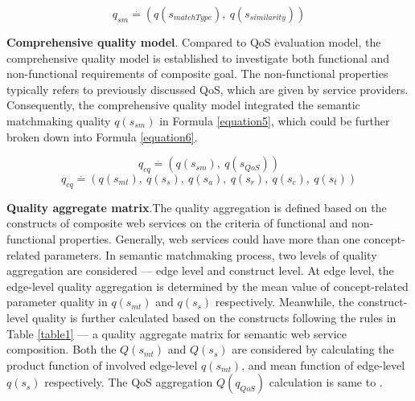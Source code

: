 \documentclass{llncs}
\begin{document}
\begin{equation}
\label{equation4}
q_{sm} \stackrel{.}{=} (q(s_ {matchType}), \  q(s_ {similarity}))
\end{equation}

\textbf{Comprehensive quality model}. Compared to QoS evaluation model, the comprehensive quality model is established to investigate both functional and non-functional requirements of composite goal. The non-functional properties typically refers to previously discussed QoS, which are given by service providers. Consequently, the comprehensive quality model integrated the semantic matchmaking quality $q(s_{sm})$ in Formula \ref{equation5}, which could be further broken down into Formula \ref{equation6}.

\begin{equation}
\label{equation5}
q_{cq} \stackrel{.}{=} (q(s_ {sm}), \  q(s_ {QoS}))
\end{equation}
\begin{equation}
\label{equation6}
q_{cq} \stackrel{.}{=} (q(s_ {mt}), \  q(s_ {s}), \  q(s_{a}),\  q(s_{r}),\  q(s_{c}),\  q(s_{t}))
\end{equation}

\textbf{Quality aggregate matrix}.The quality aggregation is defined based on the constructs of composite web services on the criteria of functional and non-functional properties. Generally, web services could have more than one concept-related parameters. In semantic matchmaking process, two levels of quality aggregation are considered --- edge level and construct level. At edge level, the edge-level quality aggregation is determined by the mean value of concept-related parameter quality in $q(s_{mt})$ and $q(s_{s})$ respectively. Meanwhile, the construct-level quality is further calculated based on the constructs following the rules in Table \ref{table1} --- a quality aggregate matrix for semantic web service composition. Both the $Q(s_{mt})$ and $Q(s_{s})$ are considered by calculating the product function of involved edge-level $q(s_{mt})$, and mean function of edge-level $q(s_{s})$ respectively. The QoS aggregation $Q(q_{QoS})$ calculation is same to \cite{cardoso2004quality}.
\end{document}
